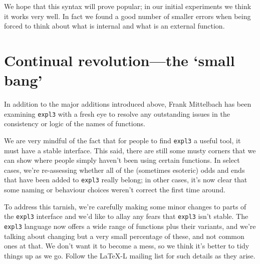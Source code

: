 \documentclass{ltnews}
\begin{document}
We hope that this syntax will prove popular; in our initial experiments we think it works very well. In fact we found a good number of smaller errors when being forced to think about what is internal and what is an external function.

\section{Continual revolution---the `small bang'}

In addition to the major additions introduced above, Frank Mittelbach has been examining \texttt{expl3} with a fresh eye to resolve any outstanding issues in the consistency or logic of the names of functions.

We are very mindful of the fact that for people to find \texttt{expl3} a useful tool, it must have a stable interface.
This said, there are still some musty corners that we can show where people simply haven't been using certain functions.
In select cases, we're re-assessing whether all of the (sometimes esoteric) odds and ends that have been added to \texttt{expl3} really belong; in other cases, it's now clear that some naming or behaviour choices weren't correct the first time around.

To address this tarnish, we're carefully making some minor changes to parts of the \texttt{expl3} interface and we'd like to allay any fears that \texttt{expl3} isn't stable.
The \texttt{expl3} language now offers a wide range of functions plus their variants, and we're talking about changing but a very small percentage of these, and not common ones at that.
We don't want it to become a mess, so we think it's better to tidy things up as we go.
Follow the LaTeX-L mailing list for such details as they arise.
\end{document}
